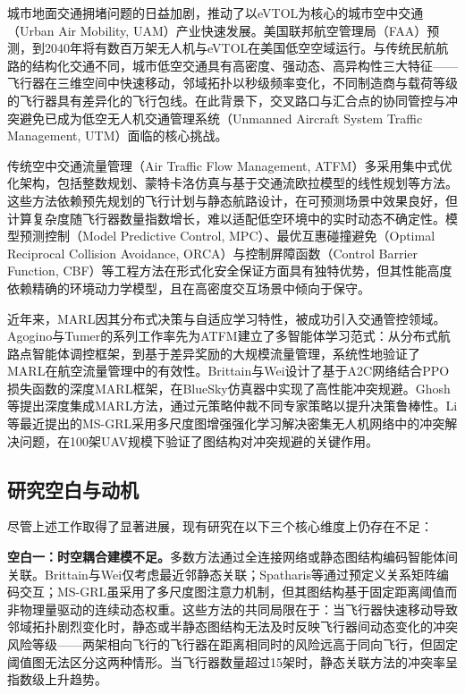 \documentclass[12pt,a4paper,UTF8]{ctexart}
\begin{document}
城市地面交通拥堵问题的日益加剧，推动了以eVTOL为核心的城市空中交通（Urban Air Mobility, UAM）产业快速发展。美国联邦航空管理局（FAA）预测，到2040年将有数百万架无人机与eVTOL在美国低空空域运行\cite{ref26}。与传统民航航路的结构化交通不同，城市低空交通具有高密度、强动态、高异构性三大特征——飞行器在三维空间中快速移动，邻域拓扑以秒级频率变化，不同制造商与载荷等级的飞行器具有差异化的飞行包线。在此背景下，交叉路口与汇合点的协同管控与冲突避免已成为低空无人机交通管理系统（Unmanned Aircraft System Traffic Management, UTM）面临的核心挑战。

传统空中交通流量管理（Air Traffic Flow Management, ATFM）多采用集中式优化架构，包括整数规划、蒙特卡洛仿真与基于交通流欧拉模型的线性规划等方法\cite{ref31}。这些方法依赖预先规划的飞行计划与静态航路设计，在可预测场景中效果良好，但计算复杂度随飞行器数量指数增长，难以适配低空环境中的实时动态不确定性。模型预测控制（Model Predictive Control, MPC）\cite{ref27}、最优互惠碰撞避免（Optimal Reciprocal Collision Avoidance, ORCA）\cite{ref22}与控制屏障函数（Control Barrier Function, CBF）\cite{ref23}等工程方法在形式化安全保证方面具有独特优势，但其性能高度依赖精确的环境动力学模型，且在高密度交互场景中倾向于保守。

近年来，MARL因其分布式决策与自适应学习特性，被成功引入交通管控领域。Agogino与Tumer的系列工作率先为ATFM建立了多智能体学习范式：从分布式航路点智能体调控框架\cite{ref1}，到基于差异奖励的大规模流量管理\cite{ref2}，系统性地验证了MARL在航空流量管理中的有效性。Brittain与Wei设计了基于A2C网络结合PPO损失函数的深度MARL框架，在BlueSky仿真器中实现了高性能冲突规避\cite{ref3}。Ghosh等提出深度集成MARL方法，通过元策略仲裁不同专家策略以提升决策鲁棒性\cite{ref9}。Li等最近提出的MS-GRL采用多尺度图增强强化学习解决密集无人机网络中的冲突解决问题，在100架UAV规模下验证了图结构对冲突规避的关键作用\cite{ref24}。

\subsection{研究空白与动机}

尽管上述工作取得了显著进展，现有研究在以下三个核心维度上仍存在不足：

\textbf{空白一：时空耦合建模不足。}多数方法通过全连接网络或静态图结构编码智能体间关联。Brittain与Wei仅考虑最近邻静态关联\cite{ref3}；Spatharis等通过预定义关系矩阵编码交互\cite{ref7}；MS-GRL虽采用了多尺度图注意力机制，但其图结构基于固定距离阈值而非物理量驱动的连续动态权重\cite{ref24}。这些方法的共同局限在于：当飞行器快速移动导致邻域拓扑剧烈变化时，静态或半静态图结构无法及时反映飞行器间动态变化的冲突风险等级——两架相向飞行的飞行器在距离相同时的风险远高于同向飞行，但固定阈值图无法区分这两种情形。当飞行器数量超过15架时，静态关联方法的冲突率呈指数级上升趋势。
\end{document}
